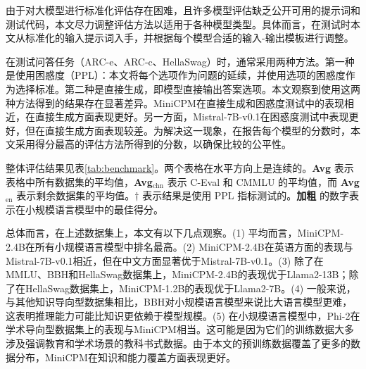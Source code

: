 由于对大模型进行标准化评估存在困难，且许多模型评估缺乏公开可用的提示词和测试代码，本文尽力调整评估方法以适用于各种模型类型。具体而言，在测试时本文从标准化的输入提示词入手，并根据每个模型合适的输入-输出模板进行调整。

在测试问答任务（ARC-e、ARC-c、HellaSwag）时，通常采用两种方法。第一种是使用困惑度（PPL）：本文将每个选项作为问题的延续，并使用选项的困惑度作为选择标准。第二种是直接生成，即模型直接输出答案选项。本文观察到使用这两种方法得到的结果存在显著差异。MiniCPM在直接生成和困惑度测试中的表现相近，在直接生成方面表现更好。另一方面，Mistral-7B-v0.1在困惑度测试中表现更好，但在直接生成方面表现较差。为解决这一现象，在报告每个模型的分数时，本文采用得分最高的评估方法所得到的分数，以确保比较的公平性。

整体评估结果见表\ref{tab:benchmark}。两个表格在水平方向上是连续的。\textbf{Avg} 表示表格中所有数据集的平均值，\textbf{Avg}$_{\text{chn}}$ 表示 C-Eval 和 CMMLU 的平均值，而 \textbf{Avg}$_{\text{en}}$ 表示剩余数据集的平均值。$\dag$ 表示结果是使用 PPL 指标测试的。\textbf{加粗} 的数字表示在小规模语言模型中的最佳得分。

总体而言，在上述数据集上，本文有以下几点观察。(1) 平均而言，MiniCPM-2.4B在所有小规模语言模型中排名最高。(2) MiniCPM-2.4B在英语方面的表现与Mistral-7B-v0.1相近，但在中文方面显著优于Mistral-7B-v0.1。(3) 除了在MMLU、BBH和HellaSwag数据集上，MiniCPM-2.4B的表现优于Llama2-13B；除了在HellaSwag数据集上，MiniCPM-1.2B的表现优于Llama2-7B。(4) 一般来说，与其他知识导向型数据集相比，BBH对小规模语言模型来说比大语言模型更难，这表明推理能力可能比知识更依赖于模型规模。(5) 在小规模语言模型中，Phi-2在学术导向型数据集上的表现与MiniCPM相当。这可能是因为它们的训练数据大多涉及强调教育和学术场景的教科书式数据。由于本文的预训练数据覆盖了更多的数据分布，MiniCPM在知识和能力覆盖方面表现更好。 


